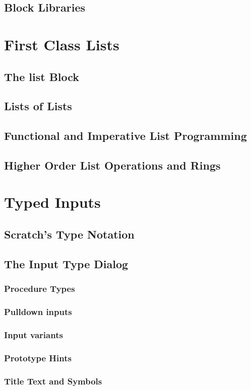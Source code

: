 \documentclass{report}
\begin{document}
\section{Block Libraries}
\chapter{First Class Lists}
\section{The list Block}
\section{Lists of Lists}
\section{Functional and Imperative List Programming}
\section{Higher Order List Operations and Rings}
\chapter{Typed Inputs}
\section{Scratch's Type Notation}
\section{The \Snap{} Input Type Dialog}
\subsection{Procedure Types}
\subsection{Pulldown inputs}
\subsection{Input variants}
\subsection{Prototype Hints}
\subsection{Title Text and Symbols}
\end{document}
